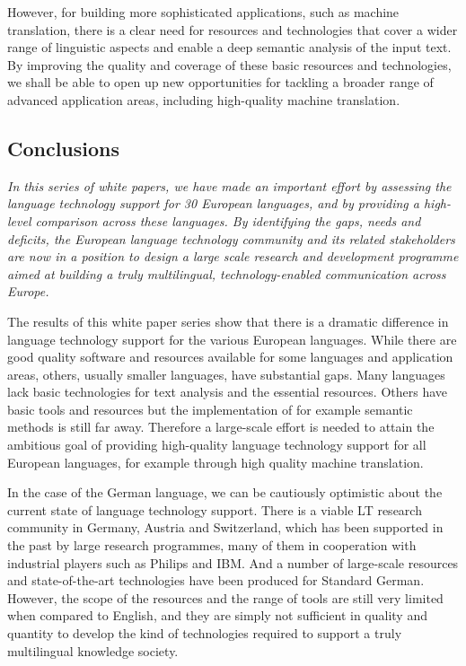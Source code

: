 \documentclass[]{../../metanetpaper}
\begin{document}
\begin{multicols}{2}
However, for building more sophisticated applications, such as machine translation, there is a clear need for resources and technologies that cover a wider range of linguistic aspects and enable a deep semantic analysis of the input text. By improving the quality and coverage of these basic resources and technologies, we shall be able to open up new opportunities for tackling a broader range of advanced application areas, including high-quality machine translation.

\subsection{Conclusions}

\emph{In this series of white papers, we have made an important effort by assessing the language technology support for 30 European languages, and by providing a high-level comparison across these languages. By identifying the gaps, needs and deficits, the European language technology community and its related stakeholders are now in a position to design a large scale research and development programme aimed at building a truly multilingual, technology-enabled communication across Europe.}

The results of this white paper series show that there is a dramatic difference in language technology support for the various European languages. While there are good quality software and resources available for some languages and application areas, others, usually smaller languages, have substantial gaps. Many languages lack basic technologies for text analysis and the essential resources. Others have basic tools and resources but the implementation of for example semantic methods is still far away. Therefore a large-scale effort is needed to attain the ambitious goal of providing high-quality language technology support for all European languages, for example through high quality machine translation. 

In the case of the German language, we can be cautiously optimistic about the current state of language technology support. There is a viable LT research community in Germany, Austria and Switzerland, which has been supported in the past by large research programmes, many of them in cooperation with industrial players such as Philips and IBM. And a number of large-scale resources and state-of-the-art technologies have been produced for Standard German. However, the scope of the resources and the range of tools are still very limited when compared to English, and they are simply not sufficient in quality and quantity to develop the kind of technologies required to support a truly multilingual knowledge society.


\end{multicols}
\end{document}
